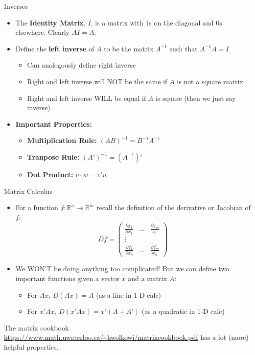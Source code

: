 \begin{frame}{Inverses}
\begin{itemize}
	\item The {\bf Identity Matrix}, $I$, is a matrix with 1s on the diagonal and 0s elsewhere. Clearly $AI = A$.	
	\item Define the {\bf left inverse} of $A$ to be the matrix $A^{-1}$ such that $A^{-1}A=I$
	\begin{itemize}
		\item Can analogously define right inverse
		\item Right and left inverse will NOT be the same if $A$ is not a square matrix
		\item Right and left inverse WILL be equal if $A$ is square (then we just say inverse)
	\end{itemize}
	\item {\bf Important Properties:}
		\begin{itemize}
			\item {\bf Multiplication Rule:} $(AB)^{-1} = B^{-1}A^{-1}$
			\item {\bf Tranpose Rule:} $(A')^{-1} = (A^{-1})'$
			\item {\bf Dot Product:} $v\cdot w = v'w$
		\end{itemize}
\end{itemize}

\end{frame}

\begin{frame}{Matrix Calculus}
	\begin{itemize}
		\item For a function $f:\mathbb{R}^n\to\mathbb{R}^m$ recall the definition of the derivative or Jacobian of $f$:
			\[
				Df = \left(\begin{array}{ccc}
					\frac{\partial f_1}{\partial x_1} & \dots & \frac{\partial f_m}{x_1}\\
					\vdots & & \\
					\frac{\partial f_1}{\partial x_n} & \dots & \frac{\partial f_m}{x_n}
					 \end{array}\right)
			\]
		\item We WON'T be doing anything too complicated! But we can define two important functions given a vector $x$ and a matrix $A$:
		\begin{itemize}
			\item For $Ax$, $D(Ax) = A$ (as a line in 1-D calc)
			\item For $x'Ax$, $D(x'Ax) = x'(A+A')$ (as a quadratic in 1-D calc)
		\end{itemize}
	\end{itemize}
	The matrix cookbook \url{https://www.math.uwaterloo.ca/~hwolkowi/matrixcookbook.pdf} has a lot (more) helpful properties.
\end{frame}




